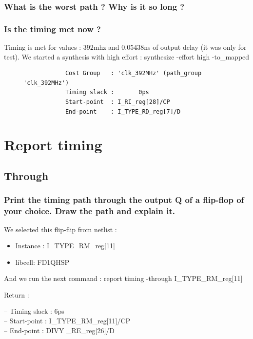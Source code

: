 \documentclass[11pt,a4paper,sans,dvipsnames]{report}
\begin{document}
	\subsubsection*{What is the worst path ? Why is it so long ?}

	\subsubsection*{Is the timing met now ?}

	Timing is met for values : 392mhz and 0.05438ns of output delay (it was only for test).
	We started a synthesis with high effort :
	{\colorbox{Gray!50}{\textcolor{RubineRed}{synthesize -effort high -to\_mapped}}}

	\begin{figure}[h!]
		\centering
		\begin{lstlisting}
			Cost Group   : 'clk_392MHz' (path_group 'clk_392MHz')
			Timing slack :       0ps 
			Start-point  : I_RI_reg[28]/CP
			End-point    : I_TYPE_RD_reg[7]/D
		\end{lstlisting}
	\end{figure}

	\newpage
	\section{Report timing}
	\subsection{Through}
	\subsubsection{
		Print the timing path through the output Q of a flip-flop of your choice. Draw the path and explain it.}
	We selected this flip-flip from netlist :
	\begin{itemize}
		\item Instance : I\_TYPE\_RM\_reg[11]
		\item libcell: FD1QHSP
	\end{itemize}

	And we run the next command : {\colorbox{Gray!50}{\textcolor{RubineRed}{report timing -through I\_TYPE\_RM\_reg[11]}}}

	Return :

	-- Timing slack :       6ps\\
	-- Start-point  : I\_TYPE\_RM\_reg[11]/CP\\
	-- End-point    : DIVY  \_RE\_reg[26]/D\\
\end{document}
